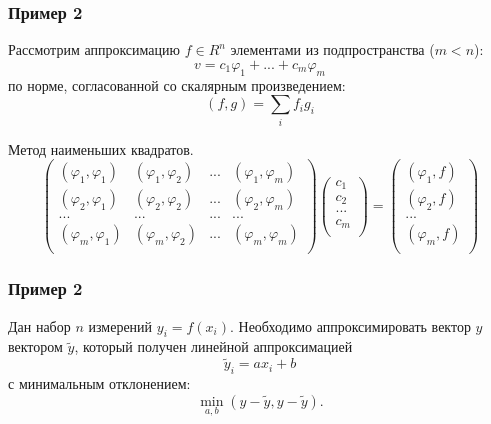 \documentclass[10pt]{beamer}
\begin{document}
\begin{frame}[fragile]
\frametitle{Пример 2}

Рассмотрим аппроксимацию $f \in R^n$ элементами из подпространства ($m < n$):
$$v = c_1 \varphi_1 + ... + c_m \varphi_m$$
по норме, согласованной со скалярным произведением:
$$(f, g) = \sum_i {f_i g_i}$$

Метод наименьших квадратов.
$$
\begin{pmatrix}
(\varphi_1, \varphi_1) & (\varphi_1, \varphi_2) & ... & (\varphi_1, \varphi_m) \\
(\varphi_2, \varphi_1) & (\varphi_2, \varphi_2) & ... & (\varphi_2, \varphi_m) \\
...						& ...					  & ... & ...					  \\
(\varphi_m, \varphi_1) & (\varphi_m, \varphi_2) & ... & (\varphi_m, \varphi_m) \\
\end{pmatrix}
\begin{pmatrix}
c_1 \\
c_2 \\
... \\
c_m \\
\end{pmatrix}
=
\begin{pmatrix}
(\varphi_1, f) \\
(\varphi_2, f) \\
... \\
(\varphi_m, f) \\
\end{pmatrix}
$$
\end{frame}


\begin{frame}[fragile]
\frametitle{Пример 2}
Дан набор $n$ измерений $y_i = f(x_i)$. Необходимо аппроксимировать вектор $y$ вектором $\tilde{y}$, который получен линейной аппроксимацией 
$$\tilde{y}_i = a x_i + b$$
с минимальным отклонением: 
$$\min_{a,b} (y - \tilde{y}, y - \tilde{y}).$$

\end{frame}
\end{document}

